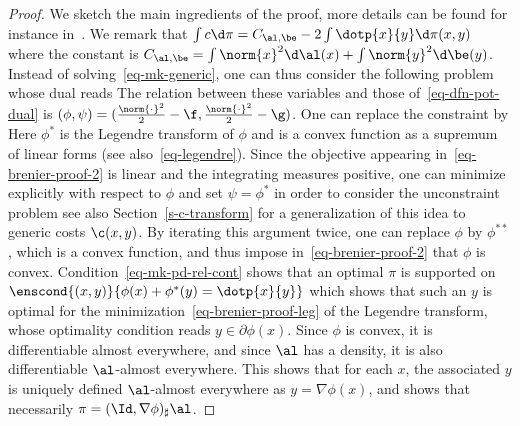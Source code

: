 \begin{proof}
	We sketch the main ingredients of the proof, more details can be found for instance in~\cite{SantambrogioBook}. 
	We remark that $\int c \d\pi = C_{\al,\be} - 2 \int \dotp{x}{y}\d\pi(x,y)$ where the constant is $C_{\al,\be} = \int \norm{x}^2\d\al(x) + \int \norm{y}^2\d\be(y)$. Instead of solving~\eqref{eq-mk-generic}, one can thus consider the following problem
	whose dual reads
	The relation between these variables and those of~\eqref{eq-dfn-pot-dual} is 
	$(\phi,\psi) = (\frac{\norm{\cdot}^2}{2}-\f,\frac{\norm{\cdot}^2}{2}-\g)$.
	One can replace the constraint by
	Here $\phi^*$ is the Legendre transform of $\phi$ and is a convex function as a supremum of linear forms (see also~\eqref{eq-legendre}). Since the objective appearing in~\eqref{eq-brenier-proof-2} is linear and the integrating measures positive, one can minimize explicitly with respect to $\phi$ and set $\psi=\phi^*$ in order to consider the unconstraint problem
	\eql{\label{eq-brenier-proof-2}
		\umin{\phi} \int_\X \phi \d\al + \int_\Y \phi^* \d\be,
	}
	see also Section~\ref{s-c-transform} for a generalization of this idea to generic costs $\c(x,y)$.
	By iterating this argument twice, one can replace $\phi$ by $\phi^{**}$, which is a convex function, and thus impose in~\eqref{eq-brenier-proof-2} that $\phi$ is convex.
	Condition~\eqref{eq-mk-pd-rel-cont} shows that an optimal $\pi$ is supported on $\enscond{(x,y)}{\phi(x)+\phi^*(y)=\dotp{x}{y}}$ which shows that such an $y$ is optimal for the minimization~\eqref{eq-brenier-proof-leg} of the Legendre transform, whose optimality condition reads $y \in \partial \phi(x)$. 
	Since $\phi$ is convex, it is differentiable almost everywhere, and since $\al$ has a density, it is also differentiable $\al$-almost everywhere. 
	This shows that for each $x$, the associated $y$ is uniquely defined $\al$-almost everywhere as $y = \nabla\phi(x)$, and shows that necessarily $\pi = (\Id,\nabla\phi)_\sharp \al$.  
\end{proof}

